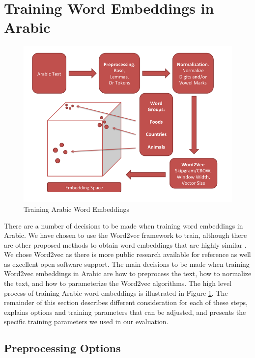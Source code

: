 \section{Training Word Embeddings in Arabic}
\label{sec:training}

\begin{figure}
\begin{center}
  \includegraphics[width=\linewidth]{diagrams/Slide1.png}
  \caption{Training Arabic Word Embeddings}
  \label{fig:training}
\end{center}
\end{figure}

There are a number of decisions to be made when training word embeddings in Arabic. We have chosen to use the Word2vec framework to train, although there are other proposed methods to obtain word embeddings that are highly similar \cite{pennington2014glove}. We chose Word2vec as there is more public research available for reference as well as excellent open software support. The main decisions to be made when training Word2vec embeddings in Arabic are how to preprocess the text, how to normalize the text, and how to parameterize the Word2vec algorithms. The high level process of training Arabic word embeddings is illustrated in Figure \ref{fig:training}. The remainder of this section describes different consideration for each of these steps, explains options and training parameters that can be adjusted, and presents the specific training parameters we used in our evaluation. 

\subsection{Preprocessing Options}

